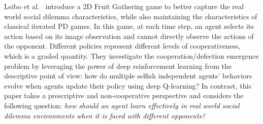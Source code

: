 \documentclass{article}
\begin{document}
Leibo et al.~ introduce a 2D Fruit Gathering game to better capture the real world social dilemma characteristics, while also maintaining the characteristics of classical iterated PD games. In this game, at each time step, an agent selects its action based on its image observation and cannot directly observe the actions of the opponent. Different policies represent different levels of cooperativeness, which is a graded quantity. They investigate the cooperation/defection emergence problem by leveraging the power of deep reinforcement learning \cite{mnih2013playing,mnih2015human} from the descriptive point of view: how do multiple selfish independent agents' behaviors evolve when agents update their policy using deep Q-learning? In contrast, this paper takes a prescriptive and non-cooperative perspective and considers the following question: {\it how should an agent learn effectively in real world social dilemma environments when it is faced with different opponents?}

\begin{comment}
To this end, this paper proposes a multiagent deep reinforcement learning approach for mutual cooperation in SPD games. Our approach consists of two phases: offline and online phases. The offline phase generates policies
with varying cooperation degrees and trains a cooperation degree detection network.
To generate policies, we first train baseline cooperation and defection policies using Actor Critic and then synthesize the full range of policies from these baseline policies. The cooperation degree detection network is implemented as an LSTM-based structure with an encoder-decoder module, trained offline. The online phase extends the Tit-for-Tat principle into sequential prisoner's dilemma scenarios. Our strategy adaptively selects its policy with the proper cooperation degree from a continuous range of candidates based on the detected cooperation degree of an opponent. Intuitively, on one hand, our overall algorithm is cooperation-oriented and seeks for mutual cooperation whenever possible; on the other hand, our algorithm is also robust against selfish exploitation and resorts to a defection strategy to avoid being exploited whenever necessary. We evaluate the performance of our deep multiagent reinforcement approach using two 2D SPD games (the Fruit Gathering and Apple-Pear games).
\end{comment}
\end{document}

